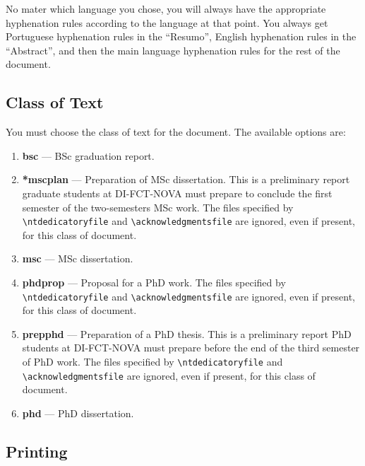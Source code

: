 No mater which language you chose, you will always have the appropriate hyphenation rules according to the language at that point. You always get Portuguese hyphenation rules in the ``Resumo'', English hyphenation rules in the ``Abstract'', and then the main language hyphenation rules for the rest of the document.




\subsection{Class of Text} %
\label{sub:class_of_text}

You must choose the class of text for the document. The available options are:

\begin{enumerate}
	\item \textbf{bsc} --- BSc graduation report.
	\item \textbf{*mscplan} --- Preparation of MSc dissertation. This is a preliminary report graduate students at DI-FCT-NOVA must prepare to conclude the first semester of the two-semesters MSc work. The files specified by \verb!\ntdedicatoryfile! and \verb!\acknowledgmentsfile! are ignored, even if present, for this class of document.
	\item \textbf{msc} --- MSc dissertation.
	\item \textbf{phdprop} ---  Proposal for a PhD work. The files specified by \verb!\ntdedicatoryfile! and \verb!\acknowledgmentsfile! are ignored, even if present, for this class of document.
	\item \textbf{prepphd} ---  Preparation of a PhD thesis. This is a preliminary report PhD students at DI-FCT-NOVA must prepare before the end of the third semester of PhD work. The files specified by \verb!\ntdedicatoryfile! and \verb!\acknowledgmentsfile! are ignored, even if present, for this class of document.
	\item \textbf{phd} --- PhD dissertation.
\end{enumerate}

\subsection{Printing} %
\label{sub:printing}

